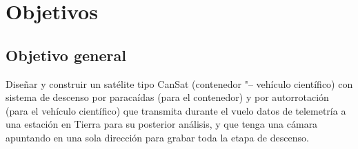 \chapter*{Objetivos}

\section*{Objetivo general}
Dise\~nar y construir un sat\'elite tipo CanSat (contenedor "-- veh\'iculo cient\'ifico) con sistema de descenso por paraca\'idas (para el contenedor) y por autorrotaci\'on (para el veh\'iculo cient\'ifico) que transmita durante el vuelo datos de telemetr\'ia a una estaci\'on en Tierra para su posterior an\'alisis, y que tenga una c\'amara apuntando en una sola direcci\'on para grabar toda la etapa de descenso.

